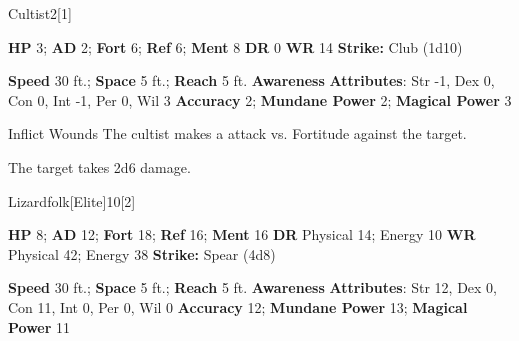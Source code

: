   \begin{monsection}{Cultist}{2}[1]
    \vspace{-1em}\vspace{-1em}
    \begin{spellcontent}
      \begin{spelltargetinginfo}
        \pari \textbf{HP} 3;
          \textbf{AD} 2;
          \textbf{Fort} 6;
          \textbf{Ref} 6;
          \textbf{Ment} 8
        \pari \textbf{DR} 0
        \pari \textbf{WR} 14
        \pari \textbf{Strike:}
            Club  (1d10)
      \end{spelltargetinginfo}
    \end{spellcontent}
    \begin{monsterfooter}
      \pari \textbf{Speed} 30 ft.;
        \textbf{Space} 5 ft.;
        \textbf{Reach} 5 ft.
      \pari \textbf{Awareness} 
      \pari \textbf{Attributes}:
        Str -1, Dex 0, Con 0,
        Int -1, Per 0, Wil 3
      \pari \textbf{Accuracy} 2;
        \textbf{Mundane Power} 2;
      \textbf{Magical Power} 3
    \end{monsterfooter}
  \end{monsection}
  \begin{freeability}{Inflict Wounds}
      The cultist makes a  attack
        vs. Fortitude against the target.
    
    \hit The target takes 2d6  damage.
    \end{freeability}
  
  \begin{monsection}{Lizardfolk}[Elite]{10}[2]
    \vspace{-1em}\vspace{-1em}
    \begin{spellcontent}
      \begin{spelltargetinginfo}
        \pari \textbf{HP} 8;
          \textbf{AD} 12;
          \textbf{Fort} 18;
          \textbf{Ref} 16;
          \textbf{Ment} 16
        \pari \textbf{DR} Physical 14; Energy 10
        \pari \textbf{WR} Physical 42; Energy 38
        \pari \textbf{Strike:}
            Spear  (4d8)
      \end{spelltargetinginfo}
    \end{spellcontent}
    \begin{monsterfooter}
      \pari \textbf{Speed} 30 ft.;
        \textbf{Space} 5 ft.;
        \textbf{Reach} 5 ft.
      \pari \textbf{Awareness} 
      \pari \textbf{Attributes}:
        Str 12, Dex 0, Con 11,
        Int 0, Per 0, Wil 0
      \pari \textbf{Accuracy} 12;
        \textbf{Mundane Power} 13;
      \textbf{Magical Power} 11
    \end{monsterfooter}
  \end{monsection}
  
